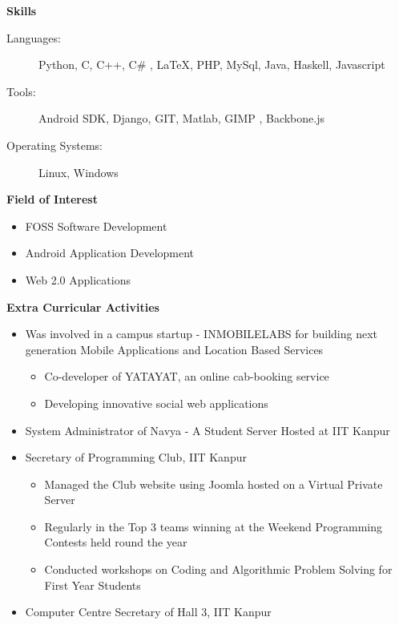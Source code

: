 \documentclass[letterpaper,11pt]{article}
\newcommand{\resheading}[1]{{\large \colorbox{mygrey}{\begin{minipage}{\textwidth}{\textbf{#1 \vphantom{p\^{E}}}}\end{minipage}}}}
\begin{document}
\resheading{Skills}

\begin{description}
\item[Languages:]
Python, C, C++,  C\# , \LaTeX, PHP, MySql, Java, Haskell, Javascript 
\item[Tools:]
Android SDK, Django, GIT, Matlab, GIMP , Backbone.js 
\item[Operating Systems:]
Linux, Windows 


\end{description}

\resheading{Field of Interest}

\begin{itemize}
	\item FOSS Software Development
	\item Android Application Development
	\item Web 2.0 Applications
\end{itemize}


\resheading{Extra Curricular Activities}

\begin{itemize}
	\item Was involved in a campus startup  - INMOBILELABS for building next generation  Mobile Applications and Location Based Services
		\begin{itemize}
			\item Co-developer of YATAYAT, an online cab-booking service
			\item Developing innovative social web applications 
		\end{itemize} 
	\item System Administrator of Navya - A Student Server Hosted at IIT Kanpur
	\item Secretary of Programming Club, IIT Kanpur
		\begin{itemize}
			\item Managed the Club website using Joomla hosted on a  Virtual Private Server
			\item Regularly in the Top 3 teams winning at the Weekend Programming Contests held round the year
			\item Conducted workshops on Coding and Algorithmic Problem Solving for First Year Students
		\end{itemize}
	\item Computer Centre Secretary of Hall 3, IIT Kanpur
	
\end{itemize}
\end{document}
